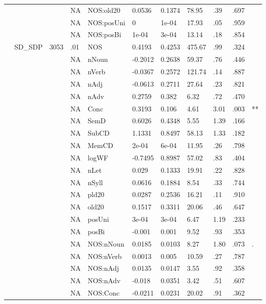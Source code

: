 \begin{table}[ht]
\begin{tabular}{lllllllllll}
   &  &  & NA & NOS:old20 & 0.0536 & 0.1374 & 78.95 & .39 & .697 &   \\ 
   &  &  & NA & NOS:posUni & 0 & 1e-04 & 17.93 & .05 & .959 &   \\ 
   &  &  & NA & NOS:posBi & 1e-04 & 3e-04 & 13.14 & .18 & .854 &   \\ 
   & SD\_SDP & 3053 & .01 & NOS & 0.4193 & 0.4253 & 475.67 & .99 & .324 &   \\ 
   &  &  & NA & nNoun & -0.2012 & 0.2638 & 59.37 & .76 & .446 &   \\ 
   &  &  & NA & nVerb & -0.0367 & 0.2572 & 121.74 & .14 & .887 &   \\ 
   &  &  & NA & nAdj & -0.0613 & 0.2711 & 27.64 & .23 & .821 &   \\ 
   &  &  & NA & nAdv & 0.2759 & 0.382 & 6.32 & .72 & .470 &   \\ 
   &  &  & NA & Conc & 0.3193 & 0.106 & 4.61 & 3.01 & .003 & ** \\ 
   &  &  & NA & SemD & 0.6026 & 0.4348 & 5.55 & 1.39 & .166 &   \\ 
   &  &  & NA & SubCD & 1.1331 & 0.8497 & 58.13 & 1.33 & .182 &   \\ 
   &  &  & NA & MemCD & 2e-04 & 6e-04 & 11.95 & .26 & .798 &   \\ 
   &  &  & NA & logWF & -0.7495 & 0.8987 & 57.02 & .83 & .404 &   \\ 
   &  &  & NA & nLet & 0.029 & 0.1333 & 19.91 & .22 & .828 &   \\ 
   &  &  & NA & nSyll & 0.0616 & 0.1884 & 8.54 & .33 & .744 &   \\ 
   &  &  & NA & pld20 & 0.0287 & 0.2536 & 16.21 & .11 & .910 &   \\ 
   &  &  & NA & old20 & 0.1517 & 0.3311 & 20.06 & .46 & .647 &   \\ 
   &  &  & NA & posUni & 3e-04 & 3e-04 & 6.47 & 1.19 & .233 &   \\ 
   &  &  & NA & posBi & -0.001 & 0.001 & 9.52 & .93 & .353 &   \\ 
   &  &  & NA & NOS:nNoun & 0.0185 & 0.0103 & 8.27 & 1.80 & .073 & . \\ 
   &  &  & NA & NOS:nVerb & 0.0013 & 0.005 & 10.59 & .27 & .787 &   \\ 
   &  &  & NA & NOS:nAdj & 0.0135 & 0.0147 & 3.55 & .92 & .358 &   \\ 
   &  &  & NA & NOS:nAdv & -0.018 & 0.0351 & 3.42 & .51 & .607 &   \\ 
   &  &  & NA & NOS:Conc & -0.0211 & 0.0231 & 20.02 & .91 & .362 &   \\ 

\end{tabular}
\end{table}
